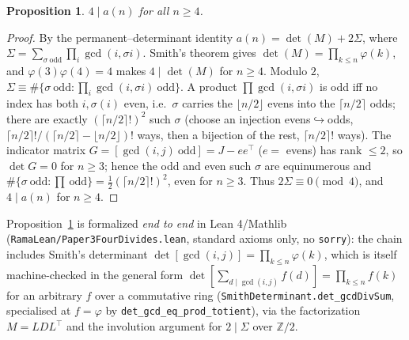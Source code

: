 \documentclass[11pt]{article}
\newtheorem{proposition}[theorem]{Proposition}
\theoremstyle{remark}\newtheorem{remark}[theorem]{Remark}
\begin{document}
\begin{proposition}\label{prop:four}
$4\mid a(n)$ for all $n\ge4$.
\end{proposition}
\begin{proof}
By the permanent--determinant identity $a(n)=\det(M)+2\Sigma$, where
$\Sigma=\sum_{\sigma\ \mathrm{odd}}\prod_i\gcd(i,\sigma i)$. Smith's theorem gives
$\det(M)=\prod_{k\le n}\varphi(k)$, and $\varphi(3)\varphi(4)=4$ makes
$4\mid\det(M)$ for $n\ge4$. Modulo $2$, $\Sigma\equiv\#\{\sigma\ \mathrm{odd}:
\prod_i\gcd(i,\sigma i)\ \mathrm{odd}\}$. A product $\prod\gcd(i,\sigma i)$ is odd
iff no index has both $i,\sigma(i)$ even, i.e.\ $\sigma$ carries the $\lfloor
n/2\rfloor$ evens into the $\lceil n/2\rceil$ odds; there are exactly
$(\lceil n/2\rceil!)^2$ such $\sigma$ (choose an injection evens$\hookrightarrow$odds,
$\lceil n/2\rceil!/(\lceil n/2\rceil-\lfloor n/2\rfloor)!$ ways, then a bijection
of the rest, $\lceil n/2\rceil!$ ways). The indicator matrix
$G=[\gcd(i,j)\ \mathrm{odd}]=J-ee^\top$ ($e=$ evens) has rank $\le2$, so $\det G=0$
for $n\ge3$; hence the odd and even such $\sigma$ are equinumerous and
$\#\{\sigma\ \mathrm{odd}:\prod\ \mathrm{odd}\}=\tfrac12(\lceil n/2\rceil!)^2$,
even for $n\ge3$. Thus $2\Sigma\equiv0\pmod4$, and $4\mid a(n)$ for $n\ge4$.
\end{proof}
Proposition~\ref{prop:four} is formalized \emph{end to end} in Lean 4/Mathlib
(\texttt{RamaLean/Paper3FourDivides.lean}, standard axioms only, no
\texttt{sorry}): the chain includes Smith's determinant
$\det[\gcd(i,j)]=\prod_{k\le n}\varphi(k)$, which is itself machine-checked in the general
form $\det[\sum_{d\mid\gcd(i,j)}f(d)]=\prod_{k\le n}f(k)$ for an arbitrary $f$ over a
commutative ring (\texttt{SmithDeterminant.det\_gcdDivSum}, specialised at $f=\varphi$ by
\texttt{det\_gcd\_eq\_prod\_totient}), via the factorization $M=LDL^\top$
and the involution argument for $2\mid\Sigma$ over $\mathbb Z/2$.
\end{document}
